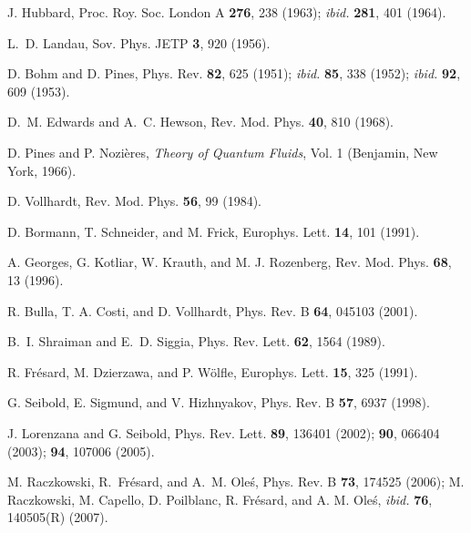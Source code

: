 \documentclass[showpacs,amsmath,twocolumn,floatfix]{revtex4-1}
\begin{document}
\begin{thebibliography}{0}

 J. Hubbard, 
                    Proc. Roy. Soc. London A \textbf{276}, 238 (1963);
                    \textit{ibid.} \textbf{281}, 401 (1964).
                    
 L.~D. Landau,
                   Sov. Phys. JETP \textbf{3}, 920 (1956).
                    
 D. Bohm and D. Pines, 
                    Phys. Rev. \textbf{82}, 625 (1951); 
                    \textit{ibid.} \textbf{85}, 338 (1952); 
                    \textit{ibid.} \textbf{92}, 609 (1953). 
                    
 D.~M. Edwards and A.~C. Hewson, Rev. Mod. Phys. \textbf{40}, 810 (1968).     

 D. Pines and P. Nozi\`eres, 
                    \textit{Theory of Quantum Fluids}, Vol. 1 (Benjamin, New York, 1966).
                    
 D. Vollhardt, 
                    Rev. Mod. Phys. \textbf{56}, 99 (1984).
                  
 D. Bormann, T. Schneider, and M. Frick,
                    Europhys. Lett. \textbf{14}, 101 (1991).
 
 A. Georges, G. Kotliar, W. Krauth, and M. J. Rozenberg, 
                    Rev. Mod. Phys. \textbf{68}, 13 (1996).
                    
 R. Bulla, T. A. Costi, and D. Vollhardt,
                   Phys. Rev. B \textbf{64}, 045103 (2001).

 B.~I. Shraiman and E.~D. Siggia, 
                    Phys. Rev. Lett. \textbf{62}, 1564 (1989).                  

 R. Fr\'esard, M. Dzierzawa, and P. W\"olfle,
                    Europhys. Lett. \textbf{15}, 325 (1991).
                    
 G. Seibold, E. Sigmund, and V. Hizhnyakov,
                    Phys. Rev. B \textbf{57}, 6937 (1998).    
             
 J. Lorenzana and G. Seibold,
                    Phys. Rev. Lett. \textbf{89}, 136401 (2002);
                                     \textbf{90}, 066404 (2003);
                                     \textbf{94}, 107006 (2005).

 M. Raczkowski, R.~Fr\'esard, and A.~M. Ole\'s,
                    Phys. Rev. B \textbf{73}, 174525 (2006);
                 M. Raczkowski, M. Capello, D. Poilblanc, R. Fr\'esard,
                    and A. M. Ole\'s,
                    \textit{ibid.} \textbf{76}, 140505(R) (2007).
                                        

\end{thebibliography}
\end{document}
